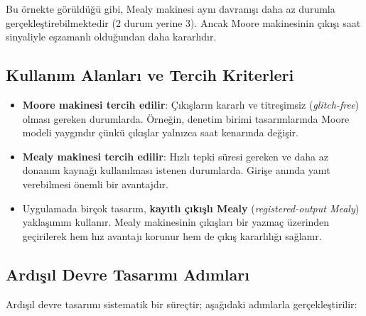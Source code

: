 Bu örnekte görüldüğü gibi, Mealy makinesi aynı davranışı daha az durumla gerçekleştirebilmektedir (2 durum yerine 3). Ancak Moore makinesinin çıkışı saat sinyaliyle eşzamanlı olduğundan daha kararlıdır.

\subsection{Kullanım Alanları ve Tercih Kriterleri}

\begin{itemize}
    \item \textbf{Moore makinesi tercih edilir}: Çıkışların kararlı ve titreşimsiz (\emph{glitch-free}) olması gereken durumlarda. Örneğin, denetim birimi tasarımlarında Moore modeli yaygındır çünkü çıkışlar yalnızca saat kenarında değişir.
    \item \textbf{Mealy makinesi tercih edilir}: Hızlı tepki süresi gereken ve daha az donanım kaynağı kullanılması istenen durumlarda. Girişe anında yanıt verebilmesi önemli bir avantajdır.
    \item Uygulamada birçok tasarım, \textbf{kayıtlı çıkışlı Mealy} (\emph{registered-output Mealy}) yaklaşımını kullanır. Mealy makinesinin çıkışları bir yazmaç üzerinden geçirilerek hem hız avantajı korunur hem de çıkış kararlılığı sağlanır.
\end{itemize}

\subsection{Ardışıl Devre Tasarımı Adımları}

Ardışıl devre tasarımı sistematik bir süreçtir; aşağıdaki adımlarla gerçekleştirilir:

